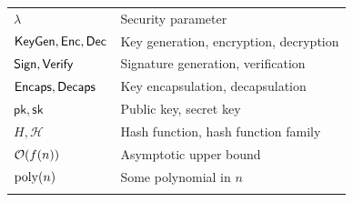 \begin{tabular}{lp{9.5cm}}
\noalign{\smallskip}\svhline\noalign{\smallskip}
$\lambda$ & Security parameter \\
$\mathsf{KeyGen}, \mathsf{Enc}, \mathsf{Dec}$ & Key generation, encryption, decryption \\
$\mathsf{Sign}, \mathsf{Verify}$ & Signature generation, verification \\
$\mathsf{Encaps}, \mathsf{Decaps}$ & Key encapsulation, decapsulation \\
$\mathsf{pk}, \mathsf{sk}$ & Public key, secret key \\
$H, \mathcal{H}$ & Hash function, hash function family \\

\noalign{\smallskip}\svhline\noalign{\smallskip}
$\mathcal{O}(f(n))$ & Asymptotic upper bound \\
$\operatorname{poly}(n)$ & Some polynomial in $n$ \\

\noalign{\smallskip}\hline
\end{tabular}
